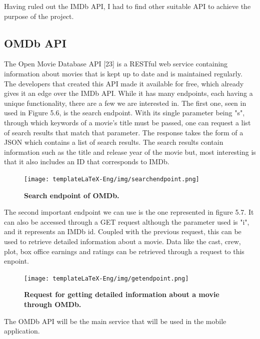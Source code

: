\documentclass[12pt,a4paper,twoside]{report}
\begin{document}
Having ruled out the IMDb API, I had to find other suitable API to achieve the purpose of the project.

\subsection{OMDb API}

The Open Movie Database API [23] is a RESTful web service containing information about movies that is kept up to date and is maintained regularly. The developers that created this API made it available for free, which already gives it an edge over the IMDb API. 
While it has many endpoints, each having a unique functionality, there are a few we are interested in. The first one, seen in used in Figure 5.6, is the search endpoint. With its single parameter being "s", through which keywords of a movie's title must be passed, one can request a list of search results that match that parameter. The response takes the form of a JSON which contains a list of search results. The search results contain information such as the title and release year of the movie but, most interesting is that it also includes an ID that corresponds to IMDb.
 \begin{figure}[H]
    \begin{center}
        \texttt{[image: templateLaTeX-Eng/img/searchendpoint.png]}
        \caption{\bf Search endpoint of OMDb.}
    \end{center}
\end{figure}

The second important endpoint we can use is the one represented in figure 5.7. It can also be accessed through a GET request although the parameter used is "i", and it represents an IMDb id. Coupled with the previous request, this can be used to retrieve detailed information about a movie. Data like the cast, crew, plot, box office earnings and ratings can be retrieved through a request to this enpoint.

 \begin{figure}[H]
    \begin{center}
        \texttt{[image: templateLaTeX-Eng/img/getendpoint.png]}
        \caption{\bf Request for getting detailed information about a movie through OMDb.}
    \end{center}
\end{figure}

\noindent The OMDb API will be the main service that will be used in the mobile application.
\end{document}
